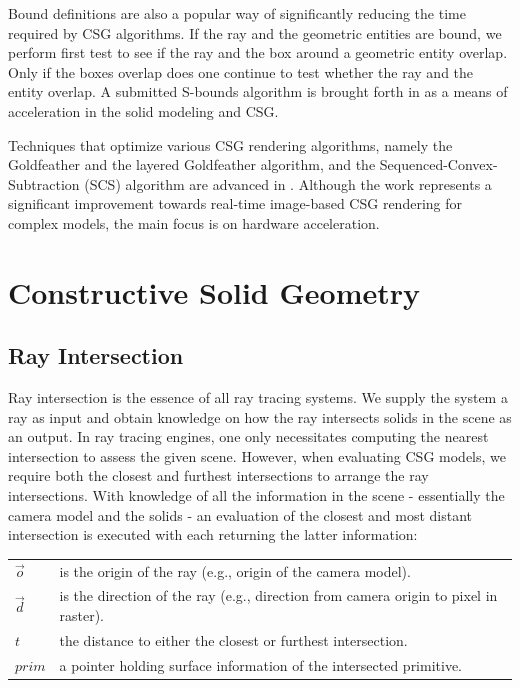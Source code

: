 \documentclass[a4paper,11pt,oneside]{article}
\makeatletter
\newenvironment{conditions}
  {\par\vspace{\abovedisplayskip}\noindent\begin{tabular}{>{$}l<{$} @{${}={}$} l}}
  {\end{tabular}\par\vspace{\belowdisplayskip}}
\makeatother
\begin{document}
Bound definitions are also a popular way of significantly reducing the time required by CSG algorithms. If the ray and the geometric entities are bound, we perform first test to see if the ray and the box around a geometric entity overlap. Only if the boxes overlap does one continue to test whether the ray and the entity overlap. A submitted S-bounds algorithm is brought forth in \cite{bounding_algorithms} as a means of acceleration in the solid modeling and CSG.
  
Techniques that optimize various CSG rendering algorithms, namely the Goldfeather and the layered Goldfeather algorithm, and the Sequenced-Convex- Subtraction (SCS) algorithm are advanced in \cite{hardware_accelerated_image_based_csg.}. Although the work represents a significant improvement towards real-time image-based CSG rendering for complex models,  the main focus is on hardware acceleration.
  

\section{Constructive Solid Geometry}
    
\subsection{Ray Intersection}
\label{section:ray-intersection}

Ray intersection is the essence of all ray tracing systems. We supply the system a ray as input and obtain knowledge on how the ray intersects solids in the scene as an output. In ray tracing engines, one only necessitates computing the nearest intersection to assess the given scene. However, when evaluating CSG models, we require both the closest and furthest intersections to arrange the ray intersections. With knowledge of all the information in the scene - essentially the camera model and the solids - an evaluation of the closest and most distant intersection is executed with each returning the latter information:

\begin{conditions}
	\vec{o}     &  is the origin of the ray (e.g., origin of the camera model). \\
	\vec{d}     &  is the direction of the ray (e.g., direction from camera origin to pixel in raster). \\
	t     &  the distance to either the closest or furthest intersection. \\
	prim    &  a pointer holding surface information of the intersected primitive. 
\end{conditions}
\end{document}
